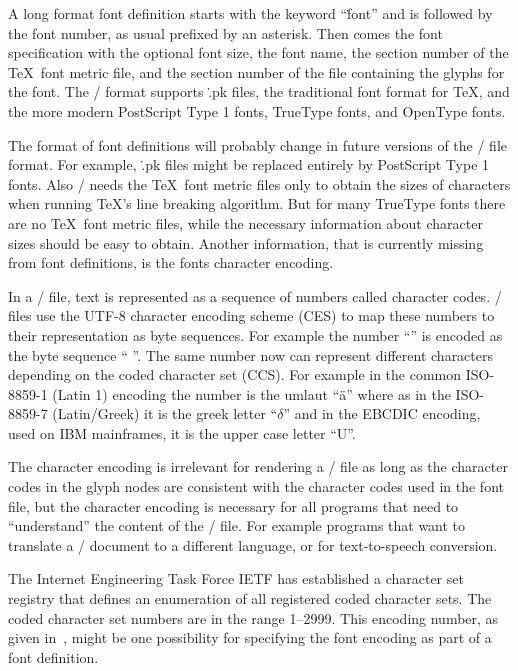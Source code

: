 A long format font definition starts with the keyword ``\.{font}'' and
is followed by the font number, as usual prefixed by an asterisk. Then
comes the font specification with the optional font size, the font
name, the section number of the \TeX\ font metric file, and the
section number of the file containing the glyphs for the font.
The \HINT/ format supports \.{.pk} files, the traditional font format
for \TeX, and the more modern PostScript Type 1 fonts,
TrueType fonts, and OpenType fonts.

The format of font definitions will probably change in future
versions of the \HINT/ file format.
For example,  \.{.pk} files might be replaced entirely by PostScript Type 1 fonts.
Also \HINT/ needs the \TeX\ font metric files only to obtain the sizes
of characters when running \TeX's line breaking algorithm.
But for many TrueType fonts there are no \TeX\ font metric files,
while the necessary information about character sizes should be easy
to obtain.
Another information, that is currently missing from font definitions,
is the fonts character encoding.

In a \HINT/ file, text is represented as a sequence of numbers called
character codes. \HINT/ files use the UTF-8 character encoding
scheme (CES) to map these numbers to their representation as byte
sequences.  For example the number ``'' is encoded as the byte
sequence `` ''.  The same number  now can represent
different characters depending on the coded character set (CCS). For
example in the common ISO-8859-1 (Latin 1) encoding the number 
is the umlaut ``\"a'' where as in the ISO-8859-7 (Latin/Greek) it is
the greek letter ``$\delta$'' and in the EBCDIC encoding, used on IBM
mainframes, it is the upper case letter ``U''.

The character encoding is
irrelevant for rendering a \HINT/ file as long as the character codes
in the glyph nodes are consistent with the character codes used in the font
file, but the character encoding is necessary for all programs that
need to ``understand'' the content of the \HINT/ file. For example
programs that want to translate a \HINT/ document to a different language,
or for text-to-speech conversion.

The Internet Engineering Task Force IETF has established a character set
registry\cite{ietf:charset-mib} that defines an enumeration of all
registered coded character sets\cite{iana:charset-mib}.  The coded
character set numbers are in the range 1--2999.
This encoding number, as given in~\cite{iana:charset},
might be one possibility for specifying the font encoding as
part of a font definition.

